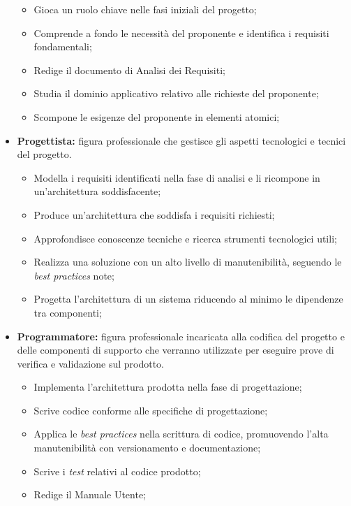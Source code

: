 \documentclass[5pt]{article}
\begin{document}
\begin{itemize}
\begin{itemize}
            \item Gioca un ruolo chiave nelle fasi iniziali del progetto;
            \item Comprende a fondo le necessità del proponente e identifica i requisiti fondamentali;
            \item Redige il documento di Analisi dei Requisiti;
            \item Studia il dominio applicativo relativo alle richieste del proponente;
            \item Scompone le esigenze del proponente in elementi atomici;
        \end{itemize}
    \item \textbf{Progettista:} figura professionale che gestisce gli aspetti tecnologici e tecnici del progetto.
        \begin{itemize}
            \item Modella i requisiti identificati nella fase di analisi e li ricompone in un'architettura soddisfacente;
            \item Produce un'architettura che soddisfa i requisiti richiesti;
            \item Approfondisce conoscenze tecniche e ricerca strumenti tecnologici utili;
            \item Realizza una soluzione con un alto livello di manutenibilità, seguendo le \textit{best practices} note;
            \item Progetta l'architettura di un sistema riducendo al minimo le dipendenze tra componenti;
        \end{itemize}
    \item \textbf{Programmatore:} figura professionale incaricata alla codifica del progetto e delle componenti di supporto che verranno utilizzate per eseguire prove di verifica e validazione sul prodotto.
        \begin{itemize}
            \item Implementa l'architettura prodotta nella fase di progettazione;
            \item Scrive codice conforme alle specifiche di progettazione;
            \item Applica le \textit{best practices} nella scrittura di codice, promuovendo l'alta manutenibilità con versionamento e documentazione;
            \item Scrive i \textit{test} relativi al codice prodotto;
            \item Redige il Manuale Utente;
        \end{itemize}

\end{itemize}
\end{document}
